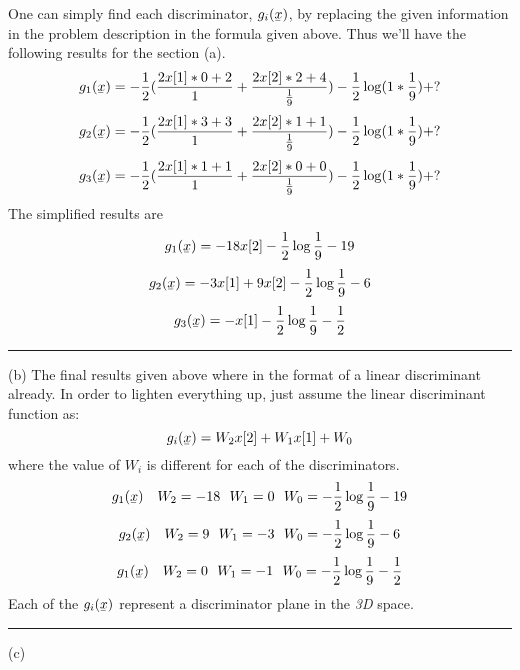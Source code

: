 \documentclass[12pt]{article}
\numberwithin{equation}{section}
\numberwithin{table}{section}
\numberwithin{figure}{section}
\begin{document}
One can simply find each discriminator, $g_{i}(\underaccent{\bar}{x})$, by replacing the given information in the problem description in the formula given above. Thus we'll have the following results for the section (a).
$$
	g_{1}(\underaccent{\bar}{x}) = -\frac{1}{2}(\frac{2x[1]*0 + 2}{1} + \frac{2x[2]*2 + 4}{\frac{1}{9}}) - \frac{1}{2}\log(1*\frac{1}{9}) + ?
$$
$$
g_{2}(\underaccent{\bar}{x}) = -\frac{1}{2}(\frac{2x[1]*3 + 3}{1} + \frac{2x[2]*1 + 1}{\frac{1}{9}}) - \frac{1}{2}\log(1*\frac{1}{9}) + ?
$$
$$
g_{3}(\underaccent{\bar}{x}) = -\frac{1}{2}(\frac{2x[1]*1 + 1}{1} + \frac{2x[2]*0 + 0}{\frac{1}{9}}) - \frac{1}{2}\log(1*\frac{1}{9}) + ?
$$
The simplified results are
$$
	g_{1}(\underaccent{\bar}{x}) = -18x[2] - \frac{1}{2}\log\frac{1}{9} - 19
$$
$$
	g_{2}(\underaccent{\bar}{x}) = -3x[1] + 9x[2] - \frac{1}{2}\log\frac{1}{9} - 6
$$
$$
	g_{3}(\underaccent{\bar}{x}) = -x[1] - \frac{1}{2}\log\frac{1}{9} - \frac{1}{2}
$$
\noindent\rule{\textwidth}{.5pt}
(b) The final results given above where in the format of a linear discriminant already. In order to lighten everything up, just assume the linear discriminant function as:
$$
	g_{i}(\underaccent{\bar}{x}) = W_{2}x[2] + W_{1}x[1] + W_0
$$
where the value of $W_i$ is different for each of the discriminators.
$$
	g_{1}(\underaccent{\bar}{x}) \ \ \ W_2 = -18 \ \ W_1 = 0 \ \ W_0 =  - \frac{1}{2}\log\frac{1}{9} - 19
$$
$$
g_{2}(\underaccent{\bar}{x}) \ \ \ W_2 = 9 \ \ W_1 = -3 \ \ W_0 =  - \frac{1}{2}\log\frac{1}{9} - 6
$$
$$
g_{1}(\underaccent{\bar}{x}) \ \ \ W_2 = 0 \ \ W_1 = -1 \ \ W_0 =  - \frac{1}{2}\log\frac{1}{9} - \frac{1}{2}
$$
Each of the $g_{i}(\underaccent{\bar}{x})$ represent a discriminator plane in the \textit{3D} space.

\noindent\rule{\textwidth}{.5pt}
(c) 
\end{document}

